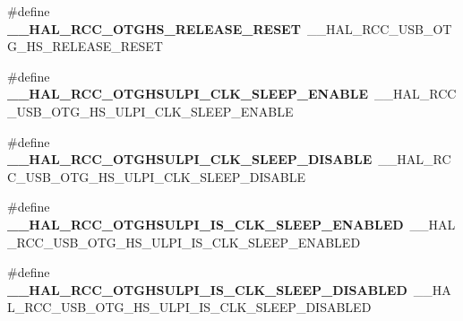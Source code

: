 \begin{DoxyCompactItemize}
\item 
\#define {\bfseries \+\_\+\+\_\+\+H\+A\+L\+\_\+\+R\+C\+C\+\_\+\+O\+T\+G\+H\+S\+\_\+\+R\+E\+L\+E\+A\+S\+E\+\_\+\+R\+E\+S\+ET}~\+\_\+\+\_\+\+H\+A\+L\+\_\+\+R\+C\+C\+\_\+\+U\+S\+B\+\_\+\+O\+T\+G\+\_\+\+H\+S\+\_\+\+R\+E\+L\+E\+A\+S\+E\+\_\+\+R\+E\+S\+ET\hypertarget{group___h_a_l___r_c_c___aliased_ga286e97629c121fbc1de30fe10102f34d}{}\label{group___h_a_l___r_c_c___aliased_ga286e97629c121fbc1de30fe10102f34d}

\item 
\#define {\bfseries \+\_\+\+\_\+\+H\+A\+L\+\_\+\+R\+C\+C\+\_\+\+O\+T\+G\+H\+S\+U\+L\+P\+I\+\_\+\+C\+L\+K\+\_\+\+S\+L\+E\+E\+P\+\_\+\+E\+N\+A\+B\+LE}~\+\_\+\+\_\+\+H\+A\+L\+\_\+\+R\+C\+C\+\_\+\+U\+S\+B\+\_\+\+O\+T\+G\+\_\+\+H\+S\+\_\+\+U\+L\+P\+I\+\_\+\+C\+L\+K\+\_\+\+S\+L\+E\+E\+P\+\_\+\+E\+N\+A\+B\+LE\hypertarget{group___h_a_l___r_c_c___aliased_ga53cf7b3f9670f3595220a196e54f2efa}{}\label{group___h_a_l___r_c_c___aliased_ga53cf7b3f9670f3595220a196e54f2efa}

\item 
\#define {\bfseries \+\_\+\+\_\+\+H\+A\+L\+\_\+\+R\+C\+C\+\_\+\+O\+T\+G\+H\+S\+U\+L\+P\+I\+\_\+\+C\+L\+K\+\_\+\+S\+L\+E\+E\+P\+\_\+\+D\+I\+S\+A\+B\+LE}~\+\_\+\+\_\+\+H\+A\+L\+\_\+\+R\+C\+C\+\_\+\+U\+S\+B\+\_\+\+O\+T\+G\+\_\+\+H\+S\+\_\+\+U\+L\+P\+I\+\_\+\+C\+L\+K\+\_\+\+S\+L\+E\+E\+P\+\_\+\+D\+I\+S\+A\+B\+LE\hypertarget{group___h_a_l___r_c_c___aliased_gac2ca3744cd2801d4d67b745cc7efc725}{}\label{group___h_a_l___r_c_c___aliased_gac2ca3744cd2801d4d67b745cc7efc725}

\item 
\#define {\bfseries \+\_\+\+\_\+\+H\+A\+L\+\_\+\+R\+C\+C\+\_\+\+O\+T\+G\+H\+S\+U\+L\+P\+I\+\_\+\+I\+S\+\_\+\+C\+L\+K\+\_\+\+S\+L\+E\+E\+P\+\_\+\+E\+N\+A\+B\+L\+ED}~\+\_\+\+\_\+\+H\+A\+L\+\_\+\+R\+C\+C\+\_\+\+U\+S\+B\+\_\+\+O\+T\+G\+\_\+\+H\+S\+\_\+\+U\+L\+P\+I\+\_\+\+I\+S\+\_\+\+C\+L\+K\+\_\+\+S\+L\+E\+E\+P\+\_\+\+E\+N\+A\+B\+L\+ED\hypertarget{group___h_a_l___r_c_c___aliased_ga43aa27fabbbe7bf33b77e0e1d8579c55}{}\label{group___h_a_l___r_c_c___aliased_ga43aa27fabbbe7bf33b77e0e1d8579c55}

\item 
\#define {\bfseries \+\_\+\+\_\+\+H\+A\+L\+\_\+\+R\+C\+C\+\_\+\+O\+T\+G\+H\+S\+U\+L\+P\+I\+\_\+\+I\+S\+\_\+\+C\+L\+K\+\_\+\+S\+L\+E\+E\+P\+\_\+\+D\+I\+S\+A\+B\+L\+ED}~\+\_\+\+\_\+\+H\+A\+L\+\_\+\+R\+C\+C\+\_\+\+U\+S\+B\+\_\+\+O\+T\+G\+\_\+\+H\+S\+\_\+\+U\+L\+P\+I\+\_\+\+I\+S\+\_\+\+C\+L\+K\+\_\+\+S\+L\+E\+E\+P\+\_\+\+D\+I\+S\+A\+B\+L\+ED\hypertarget{group___h_a_l___r_c_c___aliased_gadfa02523b89387ab4a5c377ded562699}{}\label{group___h_a_l___r_c_c___aliased_gadfa02523b89387ab4a5c377ded562699}


\end{DoxyCompactItemize}
